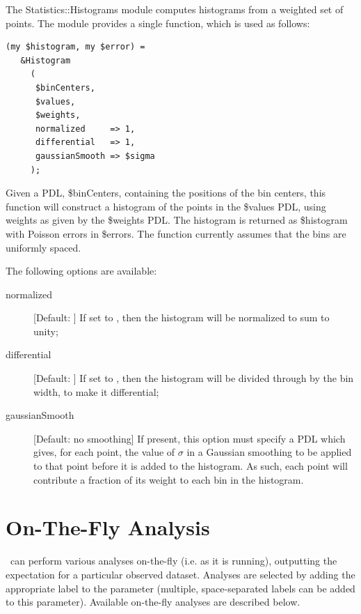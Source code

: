 The {\normalfont \ttfamily Statistics::Histograms} module computes histograms from a weighted set of points. The module provides a single function, which is used as follows:
\begin{verbatim}
(my $histogram, my $error) = 
   &Histogram
     (
      $binCenters,
      $values,
      $weights,
      normalized     => 1,
      differential   => 1,
      gaussianSmooth => $sigma
     );
\end{verbatim}
Given a PDL, {\normalfont \ttfamily \$binCenters}, containing the positions of the bin centers, this function will construct a histogram of the points in the {\normalfont \ttfamily \$values} PDL, using weights as given by the {\normalfont \ttfamily \$weights} PDL. The histogram is returned as {\normalfont \ttfamily \$histogram} with Poisson errors in {\normalfont \ttfamily \$errors}. The function currently assumes that the bins are uniformly spaced.

The following options are available:
\begin{description}
 \item [{\normalfont \ttfamily normalized}] [Default: {\normalfont {}}] If set to {\normalfont {}}, then the histogram will be normalized to sum to unity;
 \item [{\normalfont \ttfamily differential}] [Default: {\normalfont {}}] If set to {\normalfont {}}, then the histogram will be divided through by the bin width, to make it differential;
 \item[{\normalfont \ttfamily gaussianSmooth}] [Default: no smoothing] If present, this option must specify a PDL which gives, for each point, the value of $\sigma$ in a Gaussian smoothing to be applied to that point before it is added to the histogram. As such, each point will contribute a fraction of its weight to each bin in the histogram.
\end{description}

\section{On-The-Fly Analysis}\label{sec:OnTheFlyAnalysis}

\glc\ can perform various analyses on-the-fly (i.e. as it is running), outputting the expectation for a particular observed dataset. Analyses are selected by adding the appropriate label to the {\normalfont \ttfamily [mergerTreeAnalyses]} parameter (multiple, space-separated labels can be added to this parameter). Available on-the-fly analyses are described below.

